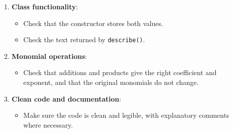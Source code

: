 \begin{enumerate}

    \item \textbf{Class functionality}:

        \begin{itemize}

            \item Check that the constructor stores both values.

            \item Check the text returned by \texttt{describe()}.

        \end{itemize}

    \item \textbf{Monomial operations}:

        \begin{itemize}

            \item Check that additions and products give the right coefficient and exponent, and that the original monomials do not change.

        \end{itemize}

    \item \textbf{Clean code and documentation}:

        \begin{itemize}

            \item Make sure the code is clean and legible, with explanatory comments where necessary.

        \end{itemize}

\end{enumerate}
